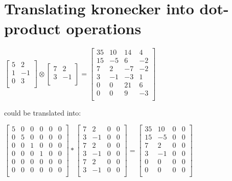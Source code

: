 \documentclass{article}
\begin{document}
\section{Translating kronecker into dot-product operations}

$


\begin{bmatrix}
5&2\\
1&-1\\
0&3\\
\end{bmatrix}
\otimes	
\begin{bmatrix}
7&2\\
3&-1\\
\end{bmatrix}
=
\begin{bmatrix}
35&10&14&4\\
15&-5&6&-2\\
7&2&-7&-2\\
3&-1&-3&1\\
0&0&21&6\\
0&0&9&-3\\
\end{bmatrix}
$

\vspace{1cm} 

could be translated into:
 
$
 
\begin{bmatrix}
5&0&0&0&0&0\\
0&5&0&0&0&0\\
0&0&1&0&0&0\\
0&0&0&1&0&0\\
0&0&0&0&0&0\\
0&0&0&0&0&0\\
\end{bmatrix}
*
\begin{bmatrix}
7&2&0&0\\
3&-1&0&0\\
7&2&0&0\\
3&-1&0&0\\
7&2&0&0\\
3&-1&0&0\\
\end{bmatrix}
=
\begin{bmatrix}
35&10&0&0\\
15&-5&0&0\\
7&2&0&0\\
3&-1&0&0\\
0&0&0&0\\
0&0&0&0\\
\end{bmatrix}
$ 
\vspace{5mm} 
\end{document}
